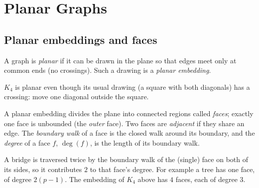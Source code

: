 \chapter{Planar Graphs}


\section{Planar embeddings and faces}

\begin{definition}[Planar]
A graph is \emph{planar} if it can be drawn in the plane so that edges meet only at common
ends (no crossings). Such a drawing is a \emph{planar embedding}.
\end{definition}

$K_4$ is planar even though its usual drawing (a square with both diagonals) has a crossing:
move one diagonal outside the square.

\begin{center}
\end{center}

\begin{definition}[Face]
A planar embedding divides the plane into connected regions called \emph{faces}; exactly one
face is unbounded (the \emph{outer} face). Two faces are \emph{adjacent} if they share an edge.
The \emph{boundary walk} of a face is the closed walk around its boundary, and the
\emph{degree} of a face $f$, $\deg(f)$, is the length of its boundary walk.
\end{definition}

A bridge is traversed twice by the boundary walk of the (single) face on both of its sides, so
it contributes $2$ to that face's degree. For example a tree has one face, of degree
$2(p-1)$. The embedding of $K_4$ above has $4$ faces, each of degree $3$.

